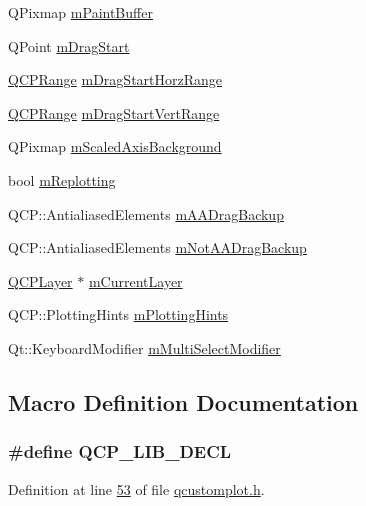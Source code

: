 \begin{DoxyCompactItemize}
Q\+Pixmap \hyperlink{a00116_a804ea55d1894964076fe02acf11da591}{m\+Paint\+Buffer}
\item 
Q\+Point \hyperlink{a00116_a23a3ce3b031eef6349252229446f3665}{m\+Drag\+Start}
\item 
\hyperlink{a00049}{Q\+C\+P\+Range} \hyperlink{a00116_a3b64958e75f713e9aa5f849e0284599e}{m\+Drag\+Start\+Horz\+Range}
\item 
\hyperlink{a00049}{Q\+C\+P\+Range} \hyperlink{a00116_aebb85632771d08a771605ccc5e0e0622}{m\+Drag\+Start\+Vert\+Range}
\item 
Q\+Pixmap \hyperlink{a00116_a9c0be35152f1cb89789149791f99044c}{m\+Scaled\+Axis\+Background}
\item 
bool \hyperlink{a00116_a38ce5778fc22072b64b7ccc05963c684}{m\+Replotting}
\item 
Q\+C\+P\+::\+Antialiased\+Elements \hyperlink{a00116_ac6e9f4d75a28eb37ee454e1907655e8b}{m\+A\+A\+Drag\+Backup}
\item 
Q\+C\+P\+::\+Antialiased\+Elements \hyperlink{a00116_aac79a49a340f3e5b06465bb730431013}{m\+Not\+A\+A\+Drag\+Backup}
\item 
\hyperlink{a00043}{Q\+C\+P\+Layer} $\ast$ \hyperlink{a00116_ae9821179b860bf04af25882e881e5e09}{m\+Current\+Layer}
\item 
Q\+C\+P\+::\+Plotting\+Hints \hyperlink{a00116_af6de5d56e261af21cf6223179fc58883}{m\+Plotting\+Hints}
\item 
Qt\+::\+Keyboard\+Modifier \hyperlink{a00116_a690dbabf892af5969b09e9f69bb83a9b}{m\+Multi\+Select\+Modifier}
\end{DoxyCompactItemize}


\subsection{Macro Definition Documentation}
\hypertarget{a00116_a5eaab02224a642ded7fb8951e973a02c}{
\subsubsection[{Q\+C\+P\+\_\+\+L\+I\+B\+\_\+\+D\+E\+C\+L}]{\setlength{\rightskip}{0pt plus 5cm}\#define Q\+C\+P\+\_\+\+L\+I\+B\+\_\+\+D\+E\+C\+L}}\label{a00116_a5eaab02224a642ded7fb8951e973a02c}


Definition at line \hyperlink{a00116_source_l00053}{53} of file \hyperlink{a00116_source}{qcustomplot.\+h}.



